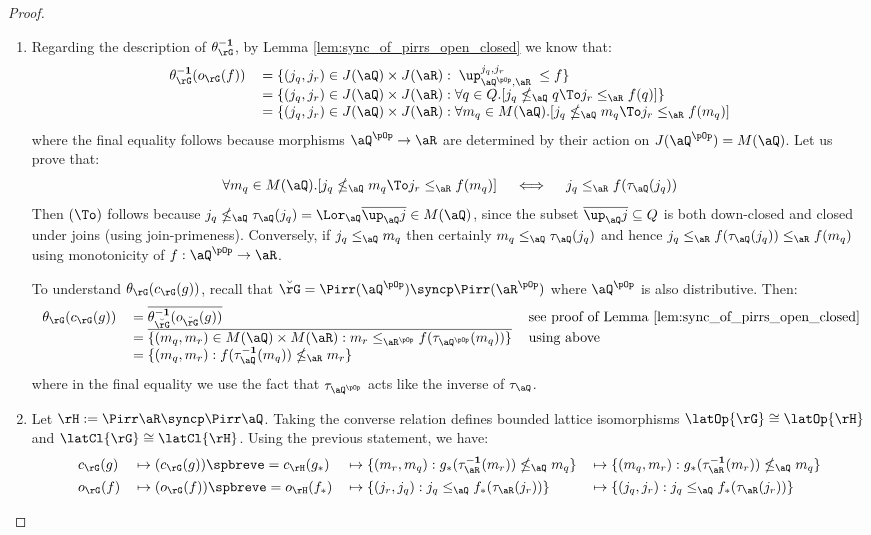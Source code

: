 \documentclass{article}
\begin{document}
\begin{proof}
\item
\begin{enumerate}
\item
Regarding the description of $\theta_\rG^{\bf-1}$, by Lemma \ref{lem:sync_of_pirrs_open_closed} we know that:
\[
\begin{tabular}{lll}
$\theta_\rG^{\bf-1}(o_\rG(f))$
&
$= \{ (j_q,j_r) \in J(\aQ) \times J(\aR) : \;  \up_{\aQ^{\pOp},\aR}^{j_q,j_r} \; \leq f \}$
\\&
$= \{ (j_q,j_r) \in J(\aQ) \times J(\aR) : \forall q \in Q.[ j_q \nleq_\aQ q \To j_r \leq_\aR f(q)] \}$
\\&
$= \{ (j_q,j_r) \in J(\aQ) \times J(\aR) : \forall m_q \in M(\aQ).[ j_q \nleq_\aQ m_q \To j_r \leq_\aR f(m_q)] $
\end{tabular}
\]
where the final equality follows because morphisms $\aQ^{\pOp} \to \aR$ are determined by their action on $J(\aQ^{\pOp}) = M(\aQ)$. Let us prove that:
\[
\forall m_q \in M(\aQ).[ j_q \nleq_\aQ m_q \To j_r \leq_\aR f(m_q)]
\quad\iff\quad
j_q \leq_\aR f(\tau_\aQ(j_q))
\]
Then $(\To)$ follows because $j_q \nleq_\aQ \tau_\aQ(j_q) = \Lor_\aQ \overline{\up_\aQ j} \in M(\aQ)$, since the subset $\overline{\up_\aQ j} \subseteq Q$ is both down-closed and closed under joins (using join-primeness). Conversely, if $j_q \leq_\aQ m_q$ then certainly $m_q \leq_\aQ \tau_\aQ(j_q)$ and hence $j_q \leq_\aR f(\tau_\aQ(j_q)) \leq_\aR f(m_q)$ using monotonicity of $f : \aQ^{\pOp} \to \aR$.

To understand $\theta_\rG(c_\rG(g))$, recall that $\breve{\rG} = \Pirr(\aQ^{\pOp}) \syncp \Pirr(\aR^{\pOp})$ where $\aQ^{\pOp}$ is also distributive. Then:
\[
\begin{tabular}{lll}
$\theta_\rG(c_\rG(g))$
&
$= \overline{\theta_{\breve{\rG}}^{\bf-1}(o_{\breve{\rG}}(g))}$
& see proof of Lemma \ref{lem:sync_of_pirrs_open_closed}
\\&
$= \overline{\{ (m_q,m_r) \in M(\aQ) \times M(\aR) : m_r \leq_{\aR^{\pOp}} f(\tau_{\aQ^{\pOp}}(m_q)) \}}$
& using above
\\&
$= \{ (m_q,m_r) : f(\tau_\aQ^{\bf-1}(m_q)) \nleq_\aR m_r \}$
\end{tabular}
\]
where in the final equality we use the fact that $\tau_{\aQ^{\pOp}}$ acts like the inverse of $\tau_\aQ$.

\item
Let $\rH := \Pirr\aR \syncp \Pirr\aQ$. Taking the converse relation defines bounded lattice isomorphisms $\latOp{\rG} \cong \latOp{\rH}$ and $\latCl{\rG} \cong \latCl{\rH}$. Using the previous statement, we have:
\[
\begin{tabular}{lllll}
$c_\rG(g)$
& $\mapsto (c_\rG(g))\spbreve = c_\rH(g_*)$
& $\mapsto \{ (m_r,m_q) : g_*(\tau_\aR^{\bf-1}(m_r)) \nleq_{\aQ} m_q \}$
& $\mapsto \{ (m_q,m_r) : g_*(\tau_\aR^{\bf-1}(m_r)) \nleq_{\aQ} m_q \}$
\\[1ex]
$o_\rG(f)$
& $\mapsto (o_\rG(f))\spbreve = o_\rH(f_*)$
& $\mapsto \{ (j_r,j_q) : j_q \leq_\aQ f_*(\tau_\aR(j_r))  \}$
& $\mapsto \{ (j_q,j_r) : j_q \leq_\aQ f_*(\tau_\aR(j_r)) \}$
\end{tabular}
\]


\end{enumerate}
\end{proof}
\end{document}
